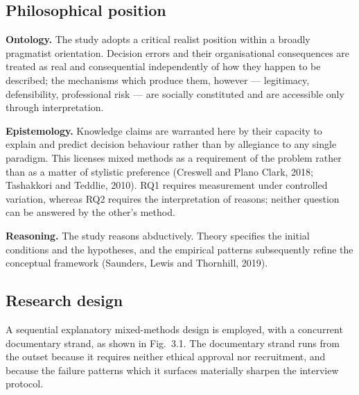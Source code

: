 \documentclass[11pt,a4paper]{article}
\numberwithin{figure}{section}
\numberwithin{table}{section}
\newcommand{\ct}[1]{\textcolor{citeblue}{#1}}          %
\newcommand{\xref}[1]{\textcolor{citeblue}{#1}}         %
\begin{document}
\subsection{Philosophical position}

\textbf{Ontology.} The study adopts a critical realist position within a broadly pragmatist
orientation. Decision errors and their organisational consequences are treated as real and
consequential independently of how they happen to be described; the mechanisms which produce them,
however --- legitimacy, defensibility, professional risk --- are socially constituted and are
accessible only through interpretation.

\textbf{Epistemology.} Knowledge claims are warranted here by their capacity to explain and predict
decision behaviour rather than by allegiance to any single paradigm. This licenses mixed methods as
a requirement of the problem rather than as a matter of stylistic preference \ct{(Creswell and
Plano Clark, 2018; Tashakkori and Teddlie, 2010)}. RQ1 requires measurement under controlled
variation, whereas RQ2 requires the interpretation of reasons; neither question can be answered by
the other's method.

\textbf{Reasoning.} The study reasons abductively. Theory specifies the initial conditions and the
hypotheses, and the empirical patterns subsequently refine the conceptual framework \ct{(Saunders,
Lewis and Thornhill, 2019)}.

\subsection{Research design}

A sequential explanatory mixed-methods design is employed, with a concurrent documentary strand, as
shown in \xref{Fig.~3.1}. The documentary strand runs from the outset because it requires neither
ethical approval nor recruitment, and because the failure patterns which it surfaces materially
sharpen the interview protocol.
\end{document}
